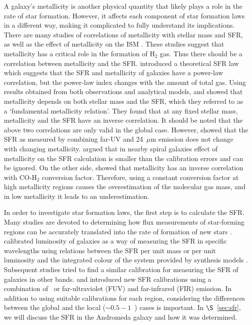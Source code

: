 A galaxy's metallicity is another physical quantity that likely plays a role in the rate of star formation. However, it affects each component of star formation laws in a different way, making it complicated to fully understand its implications. There are many studies of correlations of metallicity with stellar mass and SFR, as well as the effect of metallicity on the ISM \citep[e.g.][]{Boissier03, Leroy08, Krumholz09, Mannucci10, Dib11a, Dib11b, Lilly13}. These studies suggest that metallicity has a critical role in the formation of H$_2$ gas. Thus there should be a correlation between metallicity and the SFR. \citet{Krumholz09} introduced a theoretical SFR law which suggests that the SFR and metallicity of galaxies have a power-law correlation, but the power-law index changes with the amount of total gas. 
 Using results obtained from both observations and analytical models, \citet{Mannucci10} and \citet{Lilly13} showed that metallicity depends on both stellar mass and the SFR, which they referred to as a `fundamental metallicity relation'. They found that at any fixed stellar mass, metallicity and the SFR have an inverse correlation. It should be noted that the above two correlations are only valid in the global case. However, \citet{Leroy08} showed that the SFR as measured by combining far-UV and 24~$\mu$m emission does not change with changing metallicity. \citet{Roychowdhury15} argued that in nearby spiral galaxies effect of metallicity on the SFR calculation is smaller than the calibration errors and can be ignored. On the other side, \citet{Boissier03} showed that metallicity has an inverse correlation with CO-H$_2$ conversion factor. Therefore, using a constant conversion factor at high metallicity regions causes the overestimation of the molecular gas mass, and in low metallicity it leads to an underestimation.


In order to investigate star formation laws, the first step is to calculate the SFR. Many studies are devoted to determining how flux measurements of star-forming regions can be accurately translated into the rate of formation of new stars \citep[e.g.][]{Zhu08, Kennicutt09, Boquien10, Boquien11, Hao11, Kennicutt12, Calzetti13}. \citet{Kennicutt98b} calibrated luminosity of galaxies as a way of measuring the SFR in specific wavelengths using relations between the SFR per unit mass or per unit luminosity and the integrated colour of the system provided by synthesis models \citep[e.g.][]{Bruzual93}. Subsequent studies tried to find a similar calibration for measuring the SFR of galaxies in other bands. \citet{Kennicutt09} and \citet{Hao11} introduced new SFR calibrations using a combination of \halpha\ or far-ultraviolet (FUV) and far-infrared (FIR) emission. In addition to using suitable calibrations for each region, considering the differences between the global and the local ($\sim 0.5-1$~\kpc) cases is important. In $\S$~\ref{sec:sfr}, we will discuss the SFR in the Andromeda galaxy and how it was determined. 


